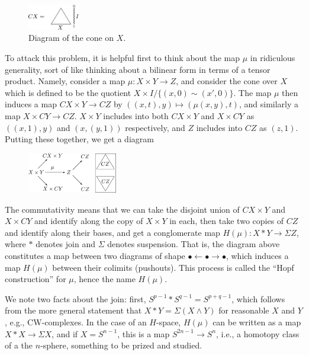 \documentclass{article}
\newcommand{\sprod}{\wedge}
\newcommand{\Suspend}{\Sigma}
\begin{document}
\begin{figure}
\centering\includegraphics[width=0.2\textwidth]{figures/fig3.pdf}
\caption{\small Diagram of the cone on $X$.}
\end{figure}
To attack this problem, it is helpful first to think about the map $\mu$ in ridiculous generality, sort of like thinking about a bilinear form in terms of a tensor product.  Namely, consider a map $\mu: X \times Y \to Z$, and consider the cone over $X$ which is defined to be the quotient $X \times I /\{(x, 0) \sim (x', 0)\}$.  The map $\mu$ then induces a map $CX \times Y \to CZ$ by $((x, t), y) \mapsto (\mu(x, y), t)$, and similarly a map $X \times CY \to CZ$.  $X \times Y$ includes into both $CX \times Y$ and $X \times CY$ as $((x, 1), y)$ and $(x, (y, 1))$ respectively, and $Z$ includes into $CZ$ as $(z, 1)$.  Putting these together, we get a diagram
\begin{figure}[h!]
\centering\includegraphics[width=0.35\textwidth]{figures/fig4.pdf} %
\end{figure}

The commutativity means that we can take the disjoint union of $CX \times Y$ and $X \times CY$ and identify along the copy of $X \times Y$ in each, then take two copies of $CZ$ and identify along their bases, and get a conglomerate map $H(\mu): X \ast Y \to \Suspend Z$, where $\ast$ denotes join and $\Suspend$ denotes suspension.
That is, the diagram above constitutes a map between two diagrams of shape $\bullet\leftarrow\bullet\rightarrow\bullet$, which induces a map $H(\mu)$ between their colimits (pushouts).
This process is called the ``Hopf construction'' for $\mu$, hence the name $H(\mu)$. 



We note two facts about the join: first, $S^{p-1} \ast S^{q-1} = S^{p + q - 1}$, which follows from the more general statement that $X \ast Y = \Suspend(X \sprod Y)$ for reasonable $X$ and $Y$, e.g., CW-complexes.  In the case of an $H$-space, $H(\mu)$ can be written as a map $X \ast X \to \Suspend X$, and if $X = S^{n-1}$, this is a map $S^{2n-1} \to S^n$, i.e., a homotopy class of a the $n$-sphere, something to be prized and studied. %
\end{document}
